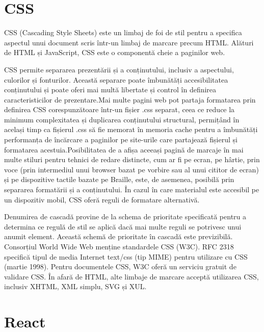 \section{CSS}
\par CSS (Cascading Style Sheets) este un limbaj de foi de stil pentru a specifica aspectul unui document scris într-un limbaj de marcare precum HTML. Alături de HTML și JavaScript, CSS este o componentă cheie a paginilor web. 
\par CSS permite separarea prezentării și a conținutului, inclusiv a aspectului, culorilor și fonturilor. Această separare poate îmbunătăți accesibilitatea conținutului și poate oferi mai multă libertate și control în definirea caracteristicilor de prezentare.Mai multe pagini web pot partaja formatarea prin definirea CSS corespunzătoare într-un fișier .css separat, ceea ce reduce la minimum complexitatea și duplicarea conținutului structural, permițând în același timp ca fișierul .css să fie memorat în memoria cache pentru a îmbunătăți performanța de încărcare a paginilor pe site-urile care partajează fișierul și formatarea acestuia.Posibilitatea de a afișa aceeași pagină de marcaje în mai multe stiluri pentru tehnici de redare distincte, cum ar fi pe ecran, pe hârtie, prin voce (prin intermediul unui browser bazat pe vorbire sau al unui cititor de ecran) și pe dispozitive tactile bazate pe Braille, este, de asemenea, posibilă prin separarea formatării și a conținutului. În cazul în care materialul este accesibil pe un dispozitiv mobil, CSS oferă reguli de formatare alternativă.

\par Denumirea de cascadă provine de la schema de prioritate specificată pentru a determina ce regulă de stil se aplică dacă mai multe reguli se potrivesc unui anumit element. Această schemă de prioritate în cascadă este previzibilă. Consorțiul World Wide Web menține standardele CSS (W3C). RFC 2318 specifică tipul de media Internet text/css (tip MIME) pentru utilizare cu CSS (martie 1998). Pentru documentele CSS, W3C oferă un serviciu gratuit de validare CSS. În afară de HTML, alte limbaje de marcare acceptă utilizarea CSS, inclusiv XHTML, XML simplu, SVG și XUL.


\section{React}
\label{sec:ch4sec1}


